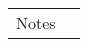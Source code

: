 \documentclass[a4paper]{article}
\begin{document}
\begin{table}[H]
\begin{tabularx}{\linewidth}{|l|X|X|X|}
  \cline{2-4} & & & \\
 \hline Notes & \multicolumn{3}{l|}{} \\
 \hline


\end{tabularx}

\end{table}
\end{document}
